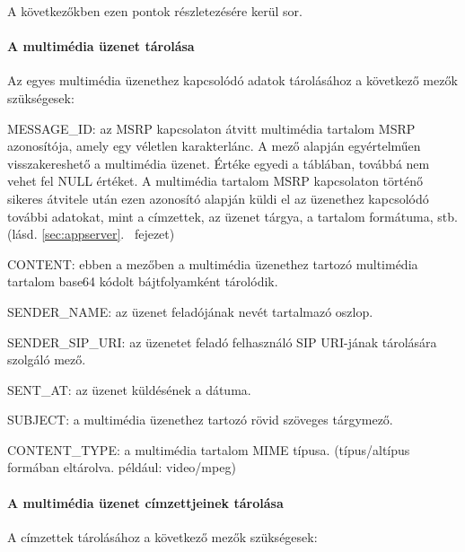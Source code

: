 A következőkben ezen pontok részletezésére kerül sor.

\paragraph*{A multimédia üzenet tárolása\\}

Az  egyes multimédia üzenethez kapcsolódó adatok tárolásához a következő mezők szükségesek:

\begin{mydescription}
\item[MESSAGE\_ID:] az MSRP kapcsolaton átvitt multimédia tartalom MSRP azonosítója, amely egy véletlen karakterlánc. A mező alapján egyértelműen visszakereshető a multimédia üzenet. Értéke egyedi a táblában, továbbá nem vehet fel NULL értéket. A multimédia tartalom MSRP kapcsolaton történő sikeres átvitele után ezen azonosító alapján küldi el az üzenethez kapcsolódó további adatokat, mint a címzettek, az üzenet tárgya, a tartalom formátuma, stb. (lásd. \ref{sec:appserver}.~ fejezet) 
\item[CONTENT:] ebben a mezőben a multimédia üzenethez tartozó multimédia tartalom base64 kódolt bájtfolyamként tárolódik.
\item[SENDER\_NAME:] az üzenet feladójának nevét tartalmazó oszlop.
\item[SENDER\_SIP\_URI:] az üzenetet feladó felhasználó SIP URI-jának tárolására szolgáló mező.
\item[SENT\_AT:] az üzenet küldésének a dátuma. 
\item[SUBJECT:] a multimédia üzenethez tartozó rövid szöveges tárgymező.
\item[CONTENT\_TYPE:] a multimédia tartalom MIME típusa. (típus/altípus formában eltárolva. például: video/mpeg)
\end{mydescription}
\medskip

\paragraph*{A multimédia üzenet címzettjeinek tárolása\\}

A címzettek tárolásához a következő mezők szükségesek:

